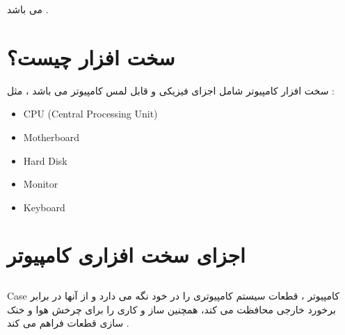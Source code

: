 \documentclass[12pt]{book}
\begin{document}
می باشد .

\section{سخت افزار چیست؟}

سخت افزار کامپیوتر شامل اجزای فیزیکی و قابل لمس کامپیوتر می باشد ، مثل :

\begin{latin}
\begin{itemize}
	\item CPU (Central Processing Unit)
	\item Motherboard
	\item Hard Disk
	\item Monitor
	\item Keyboard
\end{itemize}
\end{latin}


\newpage

\section{اجزای سخت افزاری کامپیوتر}

\subsection{}

Case
کامپیوتر ، قطعات سیستم کامپیوتری را در خود نگه می دارد و از آنها در برابر برخورد خارجی محافظت می کند، همچنین ساز و کاری را برای چرخش هوا و خنک سازی قطعات فراهم می کند .
\end{document}
